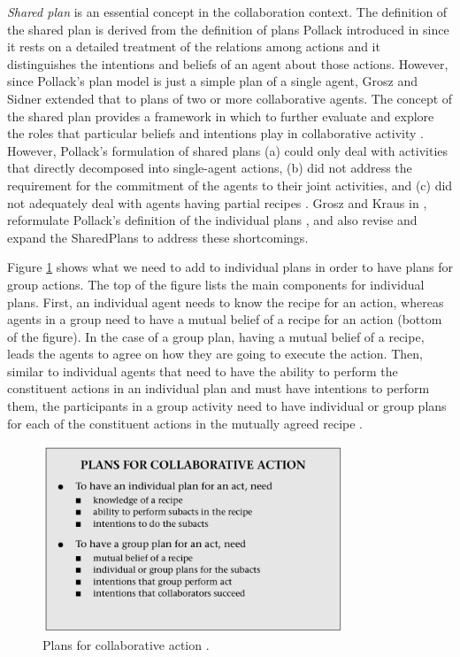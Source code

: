 \documentclass[12pt]{report}
\begin{document}
\textit{Shared plan} is an essential concept in the collaboration context.
The definition of the shared plan is derived from the definition of plans
Pollack introduced in \cite{pollack:plan-inference,
pollack:plan-mental-attitudes} since it rests on a detailed treatment of the
relations among actions and it distinguishes the intentions and beliefs of an
agent about those actions. However, since Pollack's plan model is just a simple
plan of a single agent, Grosz and Sidner extended that to plans of two or more
collaborative agents. The concept of the shared plan provides a framework in
which to further evaluate and explore the roles that particular beliefs and
intentions play in collaborative activity \cite{lochbaum:plan-models}. However,
Pollack's formulation of shared plans (a) could only deal with activities that
directly decomposed into single-agent actions, (b) did not address the
requirement for the commitment of the agents to their joint activities, and (c)
did not adequately deal with agents having partial recipes
\cite{grosz:collaboration}. Grosz and Kraus in \cite{grosz:collaboration},
reformulate Pollack's definition of the individual plans
\cite{pollack:plan-mental-attitudes}, and also revise and expand the SharedPlans
to address these shortcomings.

Figure \ref{fig:plans} shows what we need to add to individual plans in order to
have plans for group actions. The top of the figure lists the main components
for individual plans. First, an individual agent needs to know the recipe for an
action, whereas agents in a group need to have a mutual belief of a recipe for
an action (bottom of the figure). In the case of a group plan, having a mutual
belief of a recipe, leads the agents to agree on how they are going to execute
the action. Then, similar to individual agents that need to have the ability to
perform the constituent actions in an individual plan and must have intentions
to perform them, the participants in a group activity need to have individual or
group plans for each of the constituent actions in the mutually agreed recipe
\cite{grosz:collaborative-systems, grosz:plans-discourse}.

\begin{figure}[tbh]
  \center
  \includegraphics[width=0.8\textwidth]{figure/plans.png}
  \caption{Plans for collaborative action \cite{grosz:collaborative-systems}.}
  \label{fig:plans}
\end{figure}
\end{document}
